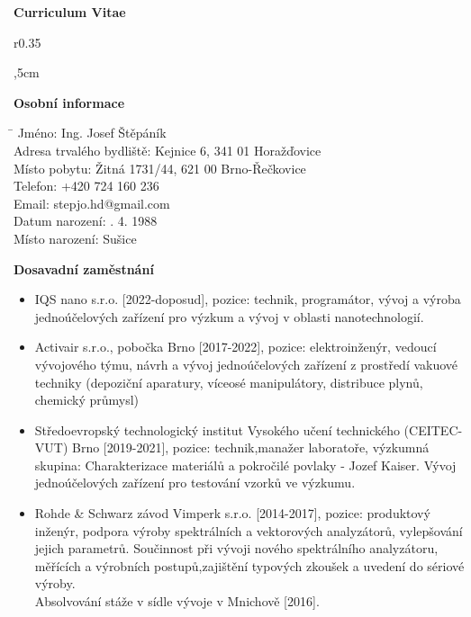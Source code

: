 \documentclass[12pt]{article}
\begin{document}
\begin{center}
\textbf{\LARGE Curriculum Vitae} \\
\end{center}

\begin{wrapfigure}{r}{0.35\textwidth}
\vspace{-1cm}
\end{wrapfigure}



,5cm

\textbf{Osobní informace} 
\begin{tabbing}
    \hspace{6cm}\= \kill
    Jméno: \> Ing. Josef Štěpáník \\
    Adresa trvalého bydliště: \> Kejnice 6, 341 01 Horažďovice \\
    Místo pobytu: \> Žitná 1731/44, 621 00 Brno-Řečkovice \\
    Telefon: \> +420 724 160 236 \\
    Email: \> stepjo.hd@gmail.com \\
    Datum narození: . 4. 1988 \\
    Místo narození: \> Sušice \\
\end{tabbing}
\vskip 1cm


\textbf{Dosavadní zaměstnání}

\begin{itemize}
\item IQS nano s.r.o. [2022-doposud], pozice: technik, programátor, vývoj a výroba jednoúčelových zařízení pro výzkum a vývoj v oblasti nanotechnologií.


\item Activair s.r.o., pobočka Brno [2017-2022], pozice: elektroinženýr, vedoucí vývojového týmu, návrh a vývoj jednoúčelových zařízení z prostředí vakuové techniky (depoziční aparatury, víceosé manipulátory, distribuce plynů, chemický průmysl) 

\item 
Středoevropský technologický institut Vysokého učení technického 
(CEITEC-VUT) Brno [2019-2021], pozice: technik,manažer laboratoře,  výzkumná skupina: Charakterizace materiálů a pokročilé povlaky - Jozef Kaiser. 
Vývoj jednoúčelových zařízení pro testování vzorků ve výzkumu. 

\item Rohde \& Schwarz závod Vimperk s.r.o. [2014-2017], pozice: produktový inženýr, podpora výroby spektrálních a vektorových analyzátorů, vylepšování jejich parametrů. Součinnost při vývoji nového spektrálního analyzátoru, měřících a výrobních postupů,zajištění typových zkoušek a uvedení do sériové výroby. \\
Absolvování stáže v sídle vývoje v Mnichově [2016].
 
\end{itemize}
\end{document}
